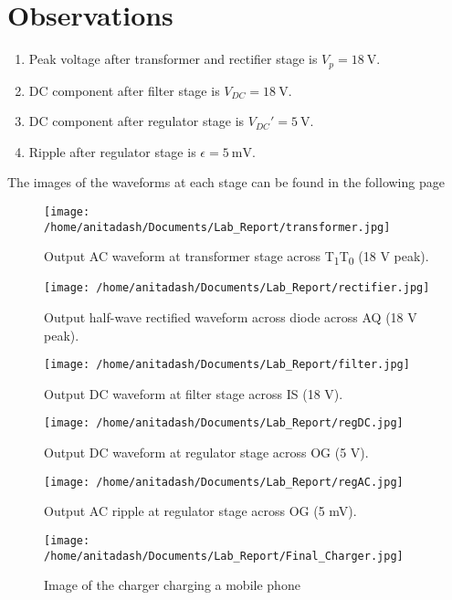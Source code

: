 \documentclass[journal,12pt,twocolumn]{IEEEtran}
\begin{document}
\section{Observations}
\begin{enumerate}
    \item Peak voltage after transformer and rectifier stage is
        $V_p = \SI[parse-numbers=false]{18}{\V}$.
    \item DC component after filter stage is 
        $V_{DC} = \SI[parse-numbers=false]{18}{\V}$.
    \item DC component after regulator stage is $V_{DC}' = \SI{5}{\V}$.
    \item Ripple after regulator stage is $\epsilon = \SI{5}{\milli\V}$.
\end{enumerate}
The images of the waveforms at each stage can be found in the following page
\begin{figure}[!ht]
    \texttt{[image: /home/anitadash/Documents/Lab\_Report/transformer.jpg]}
    \caption{Output AC waveform at transformer stage across T\textsubscript{1}T\textsubscript{0} (18 V peak).}
    \label{fig:transformer}
\end{figure}
\begin{figure}[!ht]
    \texttt{[image: /home/anitadash/Documents/Lab\_Report/rectifier.jpg]}
    \caption{Output half-wave rectified waveform across diode across AQ (18 V peak).}
    \label{fig:rectifier}
\end{figure}
\begin{figure}[!ht]
    \texttt{[image: /home/anitadash/Documents/Lab\_Report/filter.jpg]}
    \caption{Output DC waveform at filter stage across IS (18 V).}
    \label{fig:filter}
\end{figure}
\begin{figure}[!ht]
    \texttt{[image: /home/anitadash/Documents/Lab\_Report/regDC.jpg]}
    \caption{Output DC waveform at regulator stage across OG (5 V).}
    \label{fig:regulator_dc}
\end{figure}
\begin{figure}[!ht]
    \texttt{[image: /home/anitadash/Documents/Lab\_Report/regAC.jpg]}
    \caption{Output AC ripple at regulator stage across OG (5 mV).}
    \label{fig:regulator_ac}
\end{figure}
\begin{figure}[!ht]
    \texttt{[image: /home/anitadash/Documents/Lab\_Report/Final\_Charger.jpg]}
    \caption{Image of the charger charging a mobile phone}
    \label{fig:imgcharger}
\end{figure}
\end{document}
